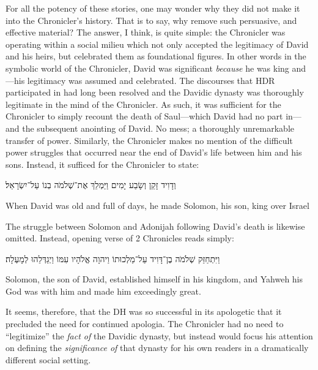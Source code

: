 For all the potency of these stories, one may wonder why they did not make it into the Chronicler's history. That is to say, why remove such persuasive, and effective material? The answer, I think, is quite simple: the Chronicler was operating within a social milieu which not only accepted the legitimacy of David and his heirs, but celebrated them as foundational figures. In other words in the symbolic world of the Chronicler, David was significant \emph{because} he was king and---his legitimacy was assumed and celebrated. The discourses that HDR participated in had long been resolved and the Davidic dynasty was thoroughly legitimate in the mind of the Chronicler. As such, it was sufficient for the Chronicler to simply recount the death of Saul---which David had no part in---and the subsequent anointing of David. No mess; a thoroughly unremarkable transfer of power. Similarly, the Chronicler makes no mention of the difficult power struggles that occurred near the end of David's life between him and his sons. Instead, it sufficed for the Chronicler to state: 
    \begin{hebrewtext}
        וְדָוִיד זָקֵן וְשָׂבַע יָמִים וַיַּמְלֵךְ אֶת־שְׁלֹמֹה בְנוֹ עַל־יִשְׂרָאֵל׃
    \end{hebrewtext}
    \begin{translation}
        When David was old and full of days, he made Solomon, his son, king over Israel
    \end{translation}
\noindent
The struggle between Solomon and Adonijah following David's death is likewise omitted. Instead, opening verse of 2 Chronicles reads simply:
    \begin{hebrewtext}
        וַיִּתְחַזֵּק שְׁלֹמֹה בֶן־דָּוִיד עַל־מַלְכוּתוֹ וַיהוָה אֱלֹהָיו עִמּוֹ וַיְגַדְּלֵהוּ לְמָעְלָה׃
    \end{hebrewtext}
    \begin{translation}
        Solomon, the son of David, established himself in his kingdom, and Yahweh his God was with him and made him exceedingly great.   
    \end{translation}
\noindent
It seems, therefore, that the DH was so successful in its apologetic that it precluded the need for continued apologia. The Chronicler had no need to ``legitimize'' the \emph{fact of} the Davidic dynasty, but instead would focus his attention on defining the \emph{significance of} that dynasty for his own readers in a dramatically different social setting.


